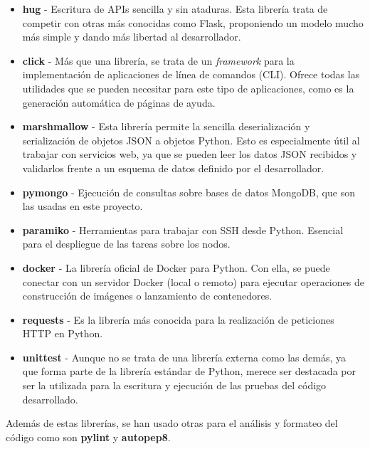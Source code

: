 \begin{itemize}
      \item \textbf{hug} - Escritura de APIs sencilla y sin ataduras. Esta
            librería trata de competir con otras más conocidas como Flask, proponiendo
            un modelo mucho más simple y dando más libertad al desarrollador.
      \item \textbf{click} - Más que una librería, se trata de un
            \textit{framework} para la implementación de aplicaciones de línea de
            comandos (CLI). Ofrece todas las utilidades que se pueden necesitar para
            este tipo de aplicaciones, como es la generación automática de páginas de
            ayuda.
      \item \textbf{marshmallow} - Esta librería permite la sencilla
            deserialización y serialización de objetos JSON a objetos Python. Esto es
            especialmente útil al trabajar con servicios web, ya que se pueden leer los
            datos JSON recibidos y validarlos frente a un esquema de datos definido por
            el desarrollador.
      \item \textbf{pymongo} - Ejecución de consultas sobre bases de datos
            MongoDB, que son las usadas en este proyecto.
      \item \textbf{paramiko} - Herramientas para trabajar con SSH desde Python.
            Esencial para el despliegue de las tareas sobre los nodos.
      \item \textbf{docker} - La librería oficial de Docker para Python. Con ella,
            se puede conectar con un servidor Docker (local o remoto) para ejecutar
            operaciones de construcción de imágenes o lanzamiento de contenedores.
      \item \textbf{requests} - Es la librería más conocida para la realización de
            peticiones HTTP en Python.
      \item \textbf{unittest} - Aunque no se trata de una librería externa como
            las demás, ya que forma parte de la librería estándar de Python, merece ser
            destacada por ser la utilizada para la escritura y ejecución de las pruebas
            del código desarrollado.
\end{itemize}

Además de estas librerías, se han usado otras para el análisis y formateo del
código como son \textbf{pylint} y \textbf{autopep8}.


